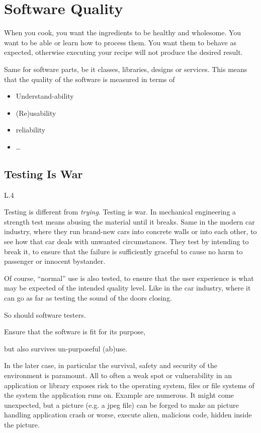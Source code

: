 \documentclass[\docroot/main]{subfiles}
\begin{document}
\section{Software Quality}
When you cook, you want the ingredients to be healthy and wholesome.
You want to be able or learn how to process them. You want them to
behave as expected, otherwise executing your recipe will not  produce
the desired result. 

Same for software parts, be it classes, libraries, designs or services.
This means that the quality of the software is measured in terms of
\begin{itemize}
\item Understand-ability
\item (Re)usability
\item reliability
\item \ldots
\end{itemize}

\subsection{Testing Is War}
\begin{wrapfigure}{L}{.4\textwidth}
\end{wrapfigure}
Testing is different from \textit{trying}. Testing is war. In mechanical
engineering a strength test means abusing the material until it breaks. Same in the
modern car industry, where they run brand-new cars into concrete walls
or into each other, to see how that car deals with unwanted circumstances.
They test by intending to break it, to ensure that the failure is
sufficiently graceful to cause no harm to passenger or innocent bystander.


Of course, ``normal'' use is also tested, to ensure that the user
experience is what may be expected of the intended quality level. Like in the car industry, where it can go as far as testing the sound of the doors closing.

So should software testers. 
\begin{itemize*}
\item Ensure that the software is fit for its purpose,
\item but also survives un-purposeful (ab)use.
\end{itemize*}
In the later case, in particular the survival, safety and security of the environment is
paramount. All to often a weak spot or vulnerability in an
application or library exposes risk to the operating system, files or
file systems of the system the application runs on. Example are
numerous. It might come unexpected, but a picture (e.g. a jpeg file)
can be forged to make an picture handling application crash or worse, execute alien, malicious code, hidden inside the picture.
\end{document}
